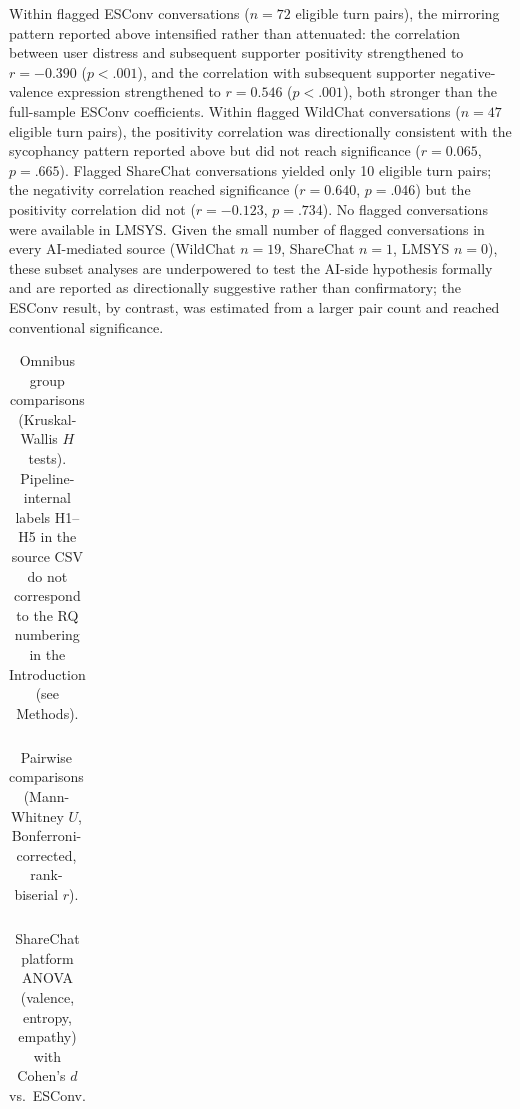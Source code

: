 \documentclass[11pt]{article}
\begin{document}
Within flagged ESConv conversations ($n = 72$ eligible turn pairs), the mirroring pattern reported above intensified rather than attenuated: the correlation between user distress and subsequent supporter positivity strengthened to $r = -0.390$ ($p < .001$), and the correlation with subsequent supporter negative-valence expression strengthened to $r = 0.546$ ($p < .001$), both stronger than the full-sample ESConv coefficients. Within flagged WildChat conversations ($n = 47$ eligible turn pairs), the positivity correlation was directionally consistent with the sycophancy pattern reported above but did not reach significance ($r = 0.065$, $p = .665$). Flagged ShareChat conversations yielded only 10 eligible turn pairs; the negativity correlation reached significance ($r = 0.640$, $p = .046$) but the positivity correlation did not ($r = -0.123$, $p = .734$). No flagged conversations were available in LMSYS. Given the small number of flagged conversations in every AI-mediated source (WildChat $n = 19$, ShareChat $n = 1$, LMSYS $n = 0$), these subset analyses are underpowered to test the AI-side hypothesis formally and are reported as directionally suggestive rather than confirmatory; the ESConv result, by contrast, was estimated from a larger pair count and reached conventional significance.

\begin{table}[htbp]
\centering
\caption{Omnibus group comparisons (Kruskal-Wallis $H$ tests). Pipeline-internal labels H1--H5 in the source CSV do not correspond to the RQ numbering in the Introduction (see Methods).}
\label{tab:2}
\begin{tabular}{l}
\toprule
\bottomrule
\end{tabular}
\end{table}

\begin{table}[htbp]
\centering
\caption{Pairwise comparisons (Mann-Whitney $U$, Bonferroni-corrected, rank-biserial $r$).}
\label{tab:3}
\begin{tabular}{l}
\toprule
\bottomrule
\end{tabular}
\end{table}

\begin{table}[htbp]
\centering
\caption{ShareChat platform ANOVA (valence, entropy, empathy) with Cohen's $d$ vs.\ ESConv.}
\label{tab:4}
\begin{tabular}{l}
\toprule
\bottomrule
\end{tabular}
\end{table}
\end{document}

